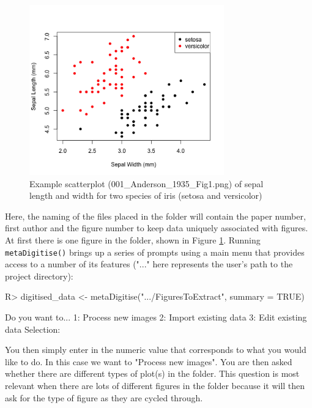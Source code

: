 \documentclass[12pt]{article}
\newcommand{\fct}[1]{\texttt{#1()}}
\begin{document}
\begin{figure}[!h]
\centering
 \includegraphics[width=0.75\textwidth]{001_Anderson_1935_Fig1.png} 
 \caption{Example scatterplot (001\_Anderson\_1935\_Fig1.png) of sepal length and width for two species of iris (setosa and versicolor)}
\label{fig:Anderson}
\end{figure}

Here, the naming of the files placed in the folder will contain the paper number, first author and the figure number to keep data uniquely associated with figures. At first there is one figure in the folder, shown in Figure \ref{fig:Anderson}. Running \fct{metaDigitise} brings up a series of prompts using a main menu that provides access to a number of its features ("..." here represents the user's path to the project directory): 

\begin{CodeChunk}
\begin{CodeInput}
R> digitised_data <- metaDigitise(".../FiguresToExtract", summary = TRUE)
\end{CodeInput}
\begin{CodeOutput}
	Do you want to...
1: Process new images
2: Import existing data
3: Edit existing data
Selection: 
\end{CodeOutput}
\end{CodeChunk}

You then simply enter in the numeric value that corresponds to what you would like to do. In this case we want to "Process new images". You are then asked whether there are different types of plot(s) in the folder. This question is most relevant when there are lots of different figures in the folder because it will then ask for the type of figure as they are cycled through.
\end{document}
